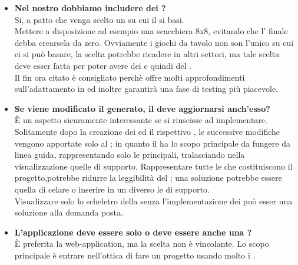 \begin{itemize}
\newpage			  	
	      \item
	      \textbf{Nel nostro  dobbiamo includere dei ?\\}
		\justifying
		Si, a patto che venga scelto un  su cui il  si basi.\\
		Mettere a disposizione ad esempio una scacchiera 8x8, evitando che l' finale debba crearsela da zero.
		Ovviamente i giochi da tavolo non son l'unico  su cui ci si può basare, la scelta potrebbe ricadere in altri settori, ma tale scelta deve esser fatta per poter avere dei  e quindi del .\\
	Il  fin ora citato è consigliato perchè offre molti approfondimenti sull'adattamento in  ed inoltre garantirà una fase di testing più piacevole. \\
	
	    \item
	    \textbf{Se viene modificato il  generato, il  deve aggiornarsi anch'esso?\\}
	    \justifying
	   È un aspetto sicuramente interessante se si riuscisse ad implementare. Solitamente dopo la creazione dei  ed il rispettivo , le successive modifiche vengono apportate solo al ; in quanto il  ha lo scopo principale da fungere da linea guida, rappresentando solo le  principali, tralasciando nella visualizzazione quelle di supporto. Rappresentare tutte le  che costituiscono il progetto,potrebbe ridurre la leggibilità del ; una soluzione potrebbe essere quella di celare o inserire in un  diverso le  di supporto.\\
     Visualizzare solo lo scheletro della  senza l'implementazione dei  può esser una soluzione alla domanda posta.\\
	     
	   	 \item
	   	 \textbf{L'applicazione deve essere solo  o deve essere anche una ?\\}
	   	 \justifying
	   	 È preferita la web-application, ma la scelta non è vincolante. Lo scopo principale è entrare nell'ottica di fare un progetto usando molto i .\\
			 	

\end{itemize}
